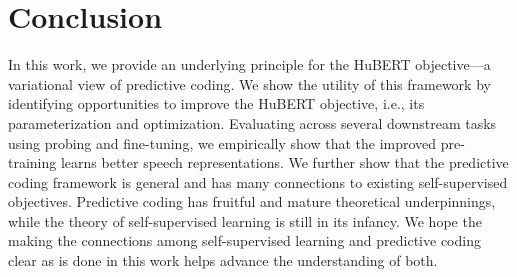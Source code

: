 \section{Conclusion}

%
%
In this work, we provide an underlying principle for the HuBERT objective---a
variational view of predictive coding.
%
%
%
%
%
%
%
%
We show the utility of this framework by identifying opportunities to improve the HuBERT objective, i.e., its parameterization and optimization.
Evaluating across several downstream tasks using probing and fine-tuning, we empirically show that the improved pre-training learns better speech representations.
We further show that the predictive coding framework is general and has many connections to existing self-supervised objectives.
%
%
%
%
%
Predictive coding has fruitful and mature theoretical underpinnings, while the theory of self-supervised learning is still in its infancy.
We hope the making the connections among self-supervised learning and predictive coding clear as is done in this work helps advance the understanding of both.

